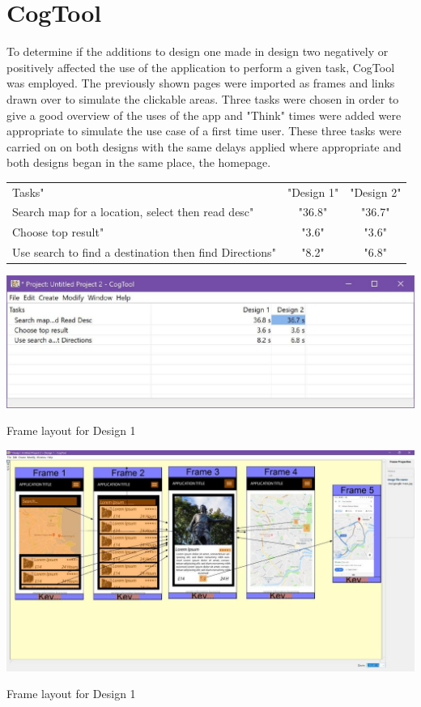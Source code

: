 \documentclass{article}
\begin{document}
\section{CogTool}
To determine if the additions to design one made in design two negatively or positively affected the use of the application to perform a given task, CogTool was employed.
The previously shown pages were imported as frames and links drawn over to simulate the clickable areas.
Three tasks were chosen in order to give a good overview of the uses of the app and "Think" times were added were appropriate to simulate the use case of a first time user.
These three tasks were carried on on both designs with the same delays applied where appropriate and both designs began in the same place, the homepage.
\begin{table}[H]
\hspace{-0.5cm}
\begin{tabular}{lcc}
\hline
Tasks"&"Design 1"&"Design 2" \\
Search map for a location, select then read desc"&"36.8"&"36.7" \\
Choose top result"&"3.6"&"3.6" \\
Use search to find a destination then find Directions"&"8.2"&"6.8" \\
\hline
\end{tabular}
\end{table}
\begin{table}[H]
\hspace{-2.5cm}
\includegraphics{images/cogtoolresults.jpg}
	\caption{Frame layout for Design 1}
\end{table}
\begin{table}[H]
\hspace{-2.5cm}
\includegraphics{images/cogtoolframes.jpg}
	\caption{Frame layout for Design 1}
\end{table}
\end{document}
